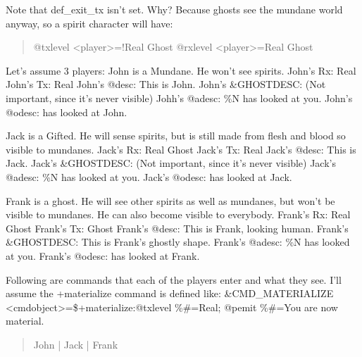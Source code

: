 \documentclass[letterpaper,10pt,english]{sphinxmanual}
\begin{document}
\sphinxAtStartPar
Note that def\_exit\_tx isn’t set. Why? Because ghosts see the mundane world
anyway, so a spirit character will have:
\begin{quote}

\sphinxAtStartPar
@txlevel \textless{}player\textgreater{}=!Real Ghost
@rxlevel \textless{}player\textgreater{}=Real Ghost
\end{quote}

\sphinxAtStartPar
Let’s assume 3 players:
John is a Mundane. He won’t see spirits.
John’s Rx: Real
John’s Tx: Real
John’s @desc: This is John.
John’s \&GHOSTDESC: (Not important, since it’s never visible)
Johh’s @adesc: \%N has looked at you.
John’s @odesc: has looked at John.

\sphinxAtStartPar
Jack is a Gifted. He will sense spirits, but is still made from flesh
and blood so visible to mundanes.
Jack’s Rx: Real Ghost
Jack’s Tx: Real
Jack’s @desc: This is Jack.
Jack’s \&GHOSTDESC: (Not important, since it’s never visible)
Jack’s @adesc: \%N has looked at you.
Jack’s @odesc: has looked at Jack.

\sphinxAtStartPar
Frank is a ghost. He will see other spirits as well as mundanes, but won’t
be visible to mundanes. He can also become visible to everybody.
Frank’s Rx: Real Ghost
Frank’s Tx: Ghost
Frank’s @desc: This is Frank, looking human.
Frank’s \&GHOSTDESC: This is Frank’s ghostly shape.
Frank’s @adesc: \%N has looked at you.
Frank’s @odesc: has looked at Frank.

\sphinxAtStartPar
Following are commands that each of the players enter and what they see.
I’ll assume the +materialize command is defined like:
\&CMD\_MATERIALIZE \textless{}cmdobject\textgreater{}=\$+materialize:@txlevel \%\#=Real; @pemit \%\#=You
are now material.
\begin{quote}
\begin{description}
\item[{John            |         Jack          |         Frank}] \leavevmode
\begin{DUlineblock}{0em}
\item[] {\color{red}\bfseries{}|}
\end{DUlineblock}

\end{description}
\end{quote}
\end{document}
